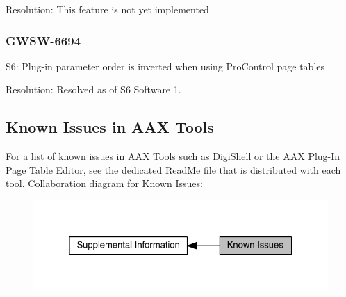 Resolution\+: This feature is not yet implemented\hypertarget{a00374_GWSW-6694}{}\subsubsection{G\+W\+S\+W-\/6694}\label{a00374_GWSW-6694}
S6\+: Plug-\/in parameter order is inverted when using Pro\+Control page tables

Resolution\+: Resolved as of S6 Software 1.\hypertarget{a00374_knownissues_tools}{}\subsection{Known Issues in A\+A\+X Tools}\label{a00374_knownissues_tools}
For a list of known issues in A\+A\+X Tools such as \hyperlink{a00365}{Digi\+Shell} or the \hyperlink{a00363_subsection_creating_page_tables_in_pete}{A\+A\+X Plug-\/\+In Page Table Editor}, see the dedicated Read\+Me file that is distributed with each tool. Collaboration diagram for Known Issues\+:
\nopagebreak
\begin{figure}[H]
\begin{center}
\leavevmode
\includegraphics[width=325pt]{a00374}
\end{center}
\end{figure}
